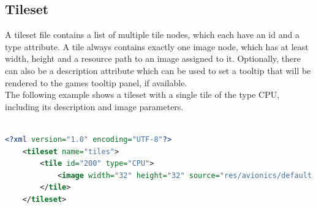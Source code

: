 \subsection{Tileset}\label{subsec:tileset}
A tileset file contains a list of multiple tile nodes, which each have an id and a type attribute.
A tile always contains exactly one image node, which has at least width, height and a resource path to an image assigned to it.
Optionally, there can also be a description attribute which can be used to set a tooltip that will be rendered to the games tooltip panel, if available.
\\
The following example shows a tileset with a single tile of the type CPU, including its description and image parameters.
\\ \\
\begin{lstlisting}[language=XML,label={lst:tileset-xml}]
    <?xml version="1.0" encoding="UTF-8"?>
    <tileset name="tiles">
        <tile id="200" type="CPU">
            <image width="32" height="32" source="res/avionics/default.png" description="Default CPU Component"/>
        </tile>
    </tileset>
\end{lstlisting}
